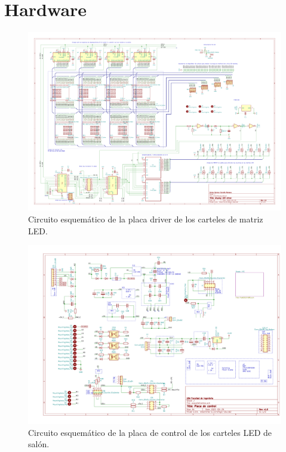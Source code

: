 \section{Hardware}

\begin{figure}[ht]
	\centering
	\includegraphics[width=1\textwidth]{./Figures/output.driverLED.pdf}
	\caption{Circuito esquemático de la placa driver de los carteles de matriz LED.}
	\label{fig:schDriverLED}
\end{figure}

\begin{figure}[ht]
	\centering
	\includegraphics[width=1\textwidth]{./Figures/output.placaControl.pdf}
	\caption{Circuito esquemático de la placa de control de los carteles LED de salón.}
	\label{fig:schController}
\end{figure}